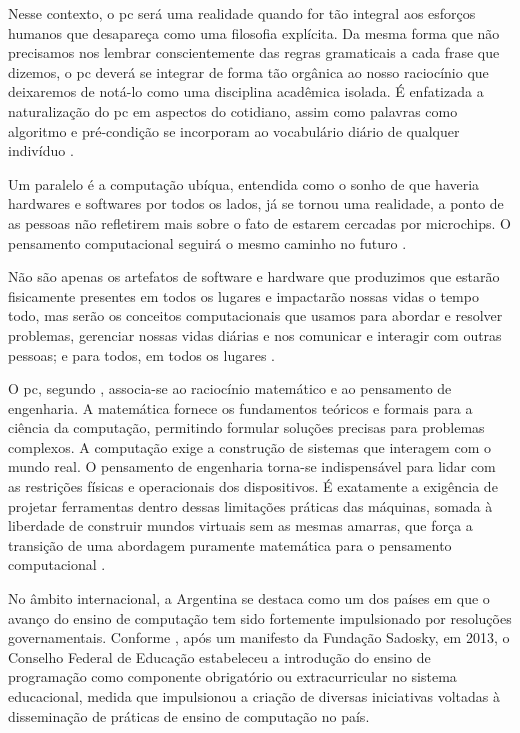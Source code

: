 Nesse contexto, o \gls{pc} será uma realidade quando for tão integral aos
esforços humanos que desapareça como uma filosofia explícita. Da mesma forma
que não precisamos nos lembrar conscientemente das regras gramaticais a cada
frase que dizemos, o \gls{pc} deverá se integrar de forma tão
orgânica ao nosso raciocínio que deixaremos de notá-lo como uma disciplina
acadêmica isolada. É enfatizada a naturalização do \gls{pc} em aspectos do
cotidiano, assim como palavras como algoritmo e pré-condição se incorporam ao
vocabulário diário de qualquer indivíduo \cite{wing2006}.


Um paralelo é a computação ubíqua, entendida como o sonho de que haveria
hardwares e softwares por todos os lados, já se tornou uma realidade, a ponto de
as pessoas não refletirem mais sobre o fato de estarem cercadas por microchips.
O pensamento computacional seguirá o mesmo caminho no futuro \cite{wing2006}.


\begin{citacao}
Não são apenas os artefatos de software e hardware que produzimos que estarão
fisicamente presentes em todos os lugares e impactarão nossas vidas o tempo todo, mas
serão os conceitos computacionais que usamos para abordar e resolver problemas,
gerenciar nossas vidas diárias e nos comunicar e interagir com outras pessoas; e
para todos, em todos os lugares \cite[tradução nossa]{wing2006}.
\end{citacao}


O \gls{pc}, segundo \cite{wing2006}, associa-se ao raciocínio matemático e ao
pensamento de engenharia. A matemática fornece os fundamentos teóricos e formais
para a ciência da computação, permitindo formular soluções precisas para
problemas complexos. A computação exige a construção de sistemas que interagem
com o mundo real. O pensamento de engenharia torna-se indispensável para lidar
com as restrições físicas e operacionais dos dispositivos. É exatamente a
exigência de projetar ferramentas dentro dessas limitações práticas das
máquinas, somada à liberdade de construir mundos virtuais sem as mesmas amarras,
que força a transição de uma abordagem puramente matemática para o pensamento
computacional \cite{wing2006}.


No âmbito internacional, a Argentina se destaca como um dos países em que o
avanço do ensino de computação tem sido fortemente impulsionado por resoluções
governamentais. Conforme \cite{brackmann2016computational}, após um manifesto da
Fundação Sadosky, em 2013, o Conselho Federal de Educação estabeleceu a
introdução do ensino de programação como componente obrigatório ou
extracurricular no sistema educacional, medida que impulsionou a criação de
diversas iniciativas voltadas à disseminação de práticas de ensino de computação
no país. 


